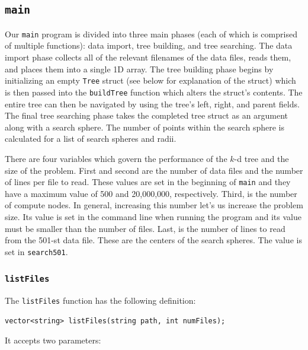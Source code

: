 \documentclass{article}
\begin{document}
%
%

\subsection{\texttt{main}}

Our \texttt{main} program is divided into three main phases (each of which is comprised of multiple functions): data import, tree building, and tree searching. The data import phase collects all of the relevant filenames of the data files, reads them, and places them into a single 1D array. The tree building phase begins by initializing an empty \texttt{Tree} struct (see below for explanation of the struct) which is then passed into the \texttt{buildTree} function which alters the struct's contents. The entire tree can then be navigated by using the tree's left, right, and parent fields. The final tree searching phase takes the completed tree struct as an argument along with a search sphere. The number of points within the search sphere is calculated for a list of search spheres and radii.

There are four variables which govern the performance of the $k$-d tree and the size of the problem. First and second are the number of data files and the number of lines per file to read. These values are set in the beginning of \texttt{main} and they have a maximum value of 500 and 20,000,000, respectively. Third, is the number of compute nodes. In general, increasing this number let's us increase the problem size. Its value is set in the command line when running the program and its value must be smaller than the number of files. Last, is the number of lines to read from the 501-st data file. These are the centers of the search spheres. The value is set in \texttt{search501}.


%
%

\subsubsection{\texttt{listFiles}}\label{sec:listfiles}

The \texttt{listFiles} function has the following definition:

\lstset{language=C++, keepspaces=true}
\begin{lstlisting}
vector<string> listFiles(string path, int numFiles); 
\end{lstlisting}

It accepts two parameters: \\
\end{document}
